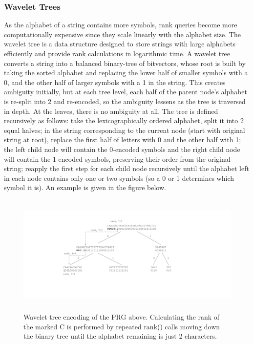 \documentclass[runningheads,a4paper]{llncs}
\begin{document}
\subsubsection{Wavelet Trees}
As the alphabet of a string contains more symbols, rank queries become more computationally expensive since they scale linearly with the alphabet size. The wavelet tree is a data structure designed to store strings with large alphabets efficiently and provide rank calculations in logarithmic time. A wavelet tree converts a string into a balanced binary-tree of bitvectors, whose root is built by taking the sorted alphabet and replacing the lower half of smaller symbols with a 0, and the other half of larger symbols with a 1 in the string. This creates ambiguity initially, but at each tree level, each half of the parent node's alphabet is re-split into 2 and re-encoded, so the ambiguity lessens as the tree is traversed in depth. At the leaves, there is no ambiguity at all. The tree is defined recursively as follows: take the lexicographically ordered alphabet, split it into 2 equal halves; in the string corresponding to the current node (start with original string at root), replace the first half of letters with 0 and the other half with 1; the left child node will contain the 0-encoded symbols and the right child node will contain the 1-encoded symbols, preserving their order from the original string; reapply the first step for each child node recursively until the alphabet left in each node contains only one or two symbols (so a 0 or 1 determines which symbol it is). An example is given in the figure below.

 \begin{figure}
\centering
\includegraphics[height=6cm]{wavelet_tree.pdf}
\caption{Wavelet tree encoding of the PRG above. Calculating the rank of the marked C is performed by repeated rank() calls moving down the binary tree until the alphabet remaining is just 2 characters.}
\label{fig:wt}
\end{figure}
\end{document}
